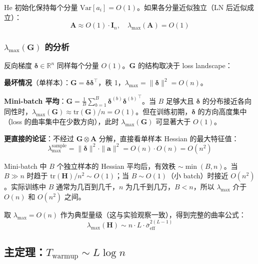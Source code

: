\documentclass[12pt, a4paper]{ctexart}
\begin{document}
He 初始化保持每个分量 $\text{Var}[a_i] = O(1)$。如果各分量近似独立（LN 后近似成立）：
\begin{equation}
    \mathbf{A} \approx O(1) \cdot \mathbf{I}_n, \quad \lambda_{\max}(\mathbf{A}) = O(1)
\end{equation}

\subsubsection{$\lambda_{\max}(\mathbf{G})$ 的分析}

反向梯度 $\boldsymbol{\delta} \in \mathbb{R}^n$ 同样每个分量 $O(1)$。$\mathbf{G}$ 的结构取决于 loss landscape：

\textbf{最坏情况}（单样本）：$\mathbf{G} = \boldsymbol{\delta}\boldsymbol{\delta}^\top$，秩 1，$\lambda_{\max} = \|\boldsymbol{\delta}\|^2 = O(n)$。

\textbf{Mini-batch 平均}：$\mathbf{G} = \frac{1}{B}\sum_{b=1}^B \boldsymbol{\delta}^{(b)}{\boldsymbol{\delta}^{(b)}}^\top$。当 $B$ 足够大且 $\boldsymbol{\delta}$ 的分布接近各向同性时，$\lambda_{\max}(\mathbf{G}) \approx \text{tr}(\mathbf{G})/n = O(1)$。但在训练初期，$\boldsymbol{\delta}$ 的方向高度集中（loss 的曲率集中在少数方向），此时 $\lambda_{\max}(\mathbf{G})$ 可显著大于 $O(1)$。

\textbf{更直接的论证}：不经过 $\mathbf{G} \otimes \mathbf{A}$ 分解，直接看单样本 Hessian 的最大特征值：
\begin{equation}
    \lambda_{\max}^{\text{sample}} = \|\boldsymbol{\delta}\|^2 \cdot \|\mathbf{a}\|^2 = O(n) \cdot O(n) = O(n^2)
\end{equation}

Mini-batch 中 $B$ 个独立样本的 Hessian 平均后，有效秩 $\sim \min(B, n)$。当 $B \gg n$ 时趋于 $\text{tr}(\mathbf{H})/n^2 \sim O(1)$；当 $B \sim O(1)$（小 batch）时接近 $O(n^2)$。实际训练中 $B$ 通常为几百到几千，$n$ 为几千到几万，$B < n$，所以 $\lambda_{\max}$ 介于 $O(n)$ 和 $O(n^2)$ 之间。

取 $\lambda_{\max} = O(n)$ 作为典型量级（这与实验观察一致），得到完整的曲率公式：
\begin{equation}
    \lambda_{\max}(\mathbf{H}) \sim n \cdot L \cdot \bar{\sigma}_{\text{eff}}^{2(L-1)}
\end{equation}

\subsection{主定理：$T_{\text{warmup}} \sim L\log n$}
\end{document}
